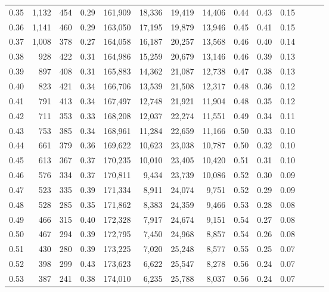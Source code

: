 \begin{tabular}{rrrrrrrrrrrrrr}
0.35 &   1,132 &  454 &  0.29 &  161,909 &   18,336 &  19,419 &  14,406 &  0.44 &  0.43 &      0.15 \\
0.36 &   1,141 &  460 &  0.29 &  163,050 &   17,195 &  19,879 &  13,946 &  0.45 &  0.41 &      0.15 \\
0.37 &   1,008 &  378 &  0.27 &  164,058 &   16,187 &  20,257 &  13,568 &  0.46 &  0.40 &      0.14 \\
0.38 &     928 &  422 &  0.31 &  164,986 &   15,259 &  20,679 &  13,146 &  0.46 &  0.39 &      0.13 \\
0.39 &     897 &  408 &  0.31 &  165,883 &   14,362 &  21,087 &  12,738 &  0.47 &  0.38 &      0.13 \\
0.40 &     823 &  421 &  0.34 &  166,706 &   13,539 &  21,508 &  12,317 &  0.48 &  0.36 &      0.12 \\
0.41 &     791 &  413 &  0.34 &  167,497 &   12,748 &  21,921 &  11,904 &  0.48 &  0.35 &      0.12 \\
0.42 &     711 &  353 &  0.33 &  168,208 &   12,037 &  22,274 &  11,551 &  0.49 &  0.34 &      0.11 \\
0.43 &     753 &  385 &  0.34 &  168,961 &   11,284 &  22,659 &  11,166 &  0.50 &  0.33 &      0.10 \\
0.44 &     661 &  379 &  0.36 &  169,622 &   10,623 &  23,038 &  10,787 &  0.50 &  0.32 &      0.10 \\
0.45 &     613 &  367 &  0.37 &  170,235 &   10,010 &  23,405 &  10,420 &  0.51 &  0.31 &      0.10 \\
0.46 &     576 &  334 &  0.37 &  170,811 &    9,434 &  23,739 &  10,086 &  0.52 &  0.30 &      0.09 \\
0.47 &     523 &  335 &  0.39 &  171,334 &    8,911 &  24,074 &   9,751 &  0.52 &  0.29 &      0.09 \\
0.48 &     528 &  285 &  0.35 &  171,862 &    8,383 &  24,359 &   9,466 &  0.53 &  0.28 &      0.08 \\
0.49 &     466 &  315 &  0.40 &  172,328 &    7,917 &  24,674 &   9,151 &  0.54 &  0.27 &      0.08 \\
0.50 &     467 &  294 &  0.39 &  172,795 &    7,450 &  24,968 &   8,857 &  0.54 &  0.26 &      0.08 \\
0.51 &     430 &  280 &  0.39 &  173,225 &    7,020 &  25,248 &   8,577 &  0.55 &  0.25 &      0.07 \\
0.52 &     398 &  299 &  0.43 &  173,623 &    6,622 &  25,547 &   8,278 &  0.56 &  0.24 &      0.07 \\
0.53 &     387 &  241 &  0.38 &  174,010 &    6,235 &  25,788 &   8,037 &  0.56 &  0.24 &      0.07 \\

\end{tabular}
